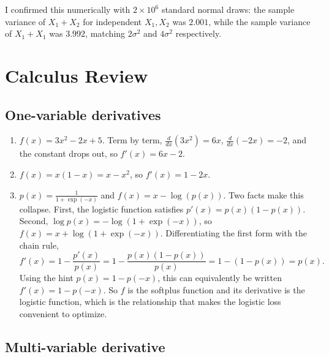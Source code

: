 \documentclass[11pt]{article}
\begin{document}
I confirmed this numerically with $2 \times 10^6$ standard normal draws: the sample variance of
$X_1 + X_2$ for independent $X_1, X_2$ was $2.001$, while the sample variance of $X_1 + X_1$ was $3.992$,
matching $2\sigma^2$ and $4\sigma^2$ respectively.

\section{Calculus Review}

\subsection{One-variable derivatives}

\begin{enumerate}
  \item $f(x) = 3x^2 - 2x + 5$. Term by term, $\frac{d}{dx}(3x^2) = 6x$, $\frac{d}{dx}(-2x) = -2$, and the
        constant drops out, so $f'(x) = 6x - 2$.

  \item $f(x) = x(1-x) = x - x^2$, so $f'(x) = 1 - 2x$.

  \item $p(x) = \frac{1}{1 + \exp(-x)}$ and $f(x) = x - \log(p(x))$. Two facts make this collapse. First,
        the logistic function satisfies $p'(x) = p(x)(1 - p(x))$. Second,
        $\log p(x) = -\log(1 + \exp(-x))$, so $f(x) = x + \log(1 + \exp(-x))$. Differentiating the first
        form with the chain rule,
        \[
          f'(x) = 1 - \frac{p'(x)}{p(x)}
                = 1 - \frac{p(x)(1 - p(x))}{p(x)}
                = 1 - (1 - p(x))
                = p(x).
        \]
        Using the hint $p(x) = 1 - p(-x)$, this can equivalently be written $f'(x) = 1 - p(-x)$. So
        $f$ is the softplus function and its derivative is the logistic function, which is the
        relationship that makes the logistic loss convenient to optimize.
\end{enumerate}

\subsection{Multi-variable derivative}
\end{document}
